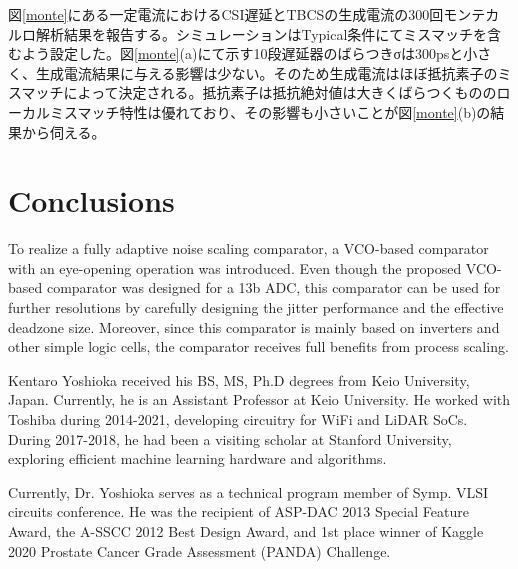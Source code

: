 \documentclass[letterpaper, 10 pt, conference]{ieeeconf}  %
\begin{document}
図\ref{monte}にある一定電流におけるCSI遅延とTBCSの生成電流の300回モンテカルロ解析結果を報告する。シミュレーションはTypical条件にてミスマッチを含むよう設定した。図\ref{monte}(a)にて示す10段遅延器のばらつきσは300psと小さく、生成電流結果に与える影響は少ない。そのため生成電流はほぼ抵抗素子のミスマッチによって決定される。抵抗素子は抵抗絶対値は大きくばらつくもののローカルミスマッチ特性は優れており、その影響も小さいことが図\ref{monte}(b)の結果から伺える。

\section{Conclusions}
To realize a fully adaptive noise scaling comparator, a VCO-based comparator with an eye-opening operation was introduced.  Even though the proposed VCO-based comparator was designed for a 13b ADC, this comparator can be used for further resolutions by carefully designing the jitter performance and the effective deadzone size. Moreover, since this comparator is mainly based on inverters and other simple logic cells, the comparator receives full benefits from process scaling. %





\begin{IEEEbiography}
{Kentaro Yoshioka}
received his BS, MS, Ph.D degrees from Keio University, Japan. Currently, he is an Assistant Professor at Keio University. He worked with Toshiba during 2014-2021, developing circuitry for WiFi and LiDAR SoCs. During 2017-2018, he had been a visiting scholar at Stanford University, exploring efficient machine learning hardware and algorithms. 

Currently, Dr. Yoshioka serves as a technical program member of Symp. VLSI circuits conference. He was the recipient of ASP-DAC 2013 Special Feature Award, the A-SSCC 2012 Best Design Award, and 1st place winner of Kaggle 2020 Prostate Cancer Grade Assessment (PANDA) Challenge.
\end{IEEEbiography}
\end{document}
